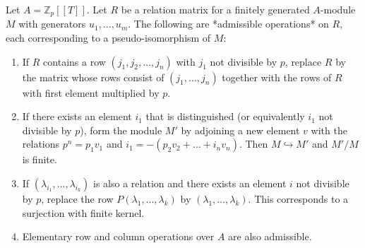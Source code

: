 Let $A = \mathbb{Z}_p[[T]]$. Let $R$ be a relation matrix for a finitely generated $A$-module $M$ with generators $u_1, \dots, u_m$. The following are *admissible operations* on $R$, each corresponding to a pseudo-isomorphism of $M$:

\begin{enumerate}
\item[(O.1)] If $R$ contains a row $(j_1, j_2, \dots, j_n)$ with $j_1$ not divisible by $p$, replace $R$ by the matrix whose rows consist of $(j_1, \dots, j_n)$ together with the rows of $R$ with first element multiplied by $p$.

\item[(O.2)] If there exists an element $i_1$ that is distinguished (or equivalently $i_1$ not divisible by $p$), form the module $M'$ by adjoining a new element $v$ with the relations $p^n = p_1 v_1$ and $i_1 = -(p_2 v_2 + \dots + i_n v_n)$. Then $M \hookrightarrow M'$ and $M'/M$ is finite.

\item[(O.3)] If $(\lambda_{i_1}, \dots, \lambda_{i_k})$ is also a relation and there exists an element $i$ not divisible by $p$, replace the row $P(\lambda_1, \dots, \lambda_k)$ by $(\lambda_1, \dots, \lambda_k)$. This corresponds to a surjection with finite kernel.

\item[Row/column operations] Elementary row and column operations over $A$ are also admissible.
\end{enumerate}
